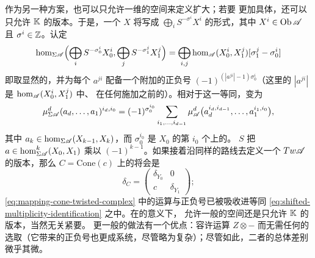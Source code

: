 \begin{remark}\label{thm:shifted-multiplicity-spaces}
作为另一种方案，也可以只允许一维的\trMultiplicity{}空间来定义\trAdditive{}扩大；若要
更加具体，还可以只允许 $\mathbb{K}$ 的\trSuspension{}版本。于是，一个\trObject{} $X$ 将写成%
\trDirectSum{} $\bigoplus_i S^{-\sigma^i}X^i$ 的形式，其中 $X^i\in\operatorname{Ob}\mathscr{A}$ 且
$\sigma^i\in\mathbb{Z}$。认定
\begin{equation}\label{eq:shifted-multiplicity-identification}
\hom_{\Sigma\mathscr{A}}\Bigl(\bigoplus_i S^{-\sigma^i_0}X^i_0,
\bigoplus_j S^{-\sigma^j_1}X^j_1\Bigr)
=\bigoplus_{i,j}\hom_{\mathscr{A}}(X^i_0,X^j_1)[\sigma^j_1-\sigma^i_0]
\end{equation}
即取显然的\trIsomorphism，并为每个\trCoefficients{} $a^{ji}$ 配备一个附加的正负号
$(-1)^{(|a^{ji}|-1)\sigma^i_0}$（这里的 $|a^{ji}|$ 是 $\hom_{\mathscr{A}}(X^i_0,X^j_1)$ 中、
在任何\trSuspension{}施加之前的\trDegree）。相对于这一等同，\trComposition{}变为
\begin{equation*}
\mu^d_{\Sigma\mathscr{A}}(a_d,\ldots,a_1)^{i_d,i_0}=(-1)^{\sigma^{i_0}_0}
\sum_{i_1,\ldots,i_{d-1}}\mu^d_{\mathscr{A}}\bigl(a_d^{i_d,i_{d-1}},\ldots,a_1^{i_1,i_0}\bigr),
\end{equation*}
其中 $a_k\in\hom_{\Sigma\mathscr{A}}(X_{k-1},X_k)$，而 $\sigma^{i_0}_0$ 是 $X_0$ 的第 $i_0$
个\trDirectSummand{}上的\trSuspension。\trShiftFunctor{} $S$ 把\trMorphism{}%
$a\in\hom^k_{\Sigma\mathscr{A}}(X_0,X_1)$ 乘以 $(-1)^{k-1}$。如果接着沿同样的路线去定义一个
$Tw\mathscr{A}$ 的版本，那么 $C=\mathrm{Cone}(c)$ 上的\trDifferential{}将会是
\begin{equation*}
\delta_C=\begin{pmatrix}\delta_{Y_0} & 0\\ c & \delta_{Y_1}\end{pmatrix};
\end{equation*}
\eqref{eq:mapping-cone-twisted-complex} 中的\trSuspension{}运算与正负号已被吸收进等同
\eqref{eq:shifted-multiplicity-identification} 之中。在\trQuasiequivalence{}的意义下，
允许一般的\trMultiplicity{}空间还是只允许 $\mathbb{K}$ 的\trSuspension{}版本，当然无关紧要。
更一般的做法有一个优点：容许\trTensorProduct{}运算 $Z\otimes-$ 而无需任何\trBasis{}的
选取（它带来的正负号也更成系统，尽管略为复杂）；尽管如此，二者的总体差别微乎其微。
\end{remark}
